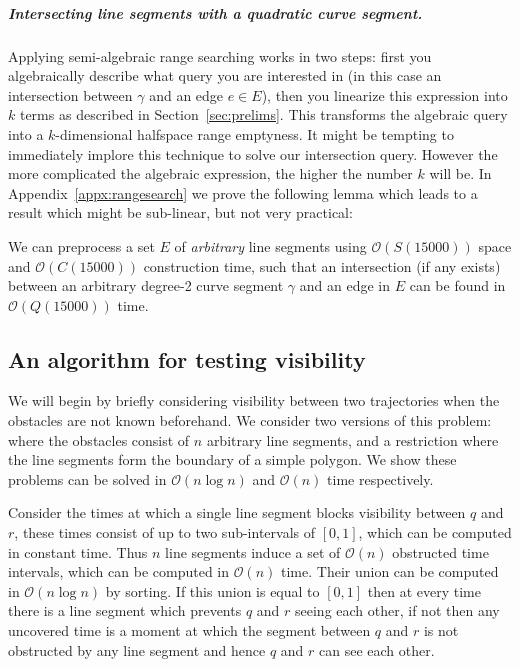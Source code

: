 \documentclass[UKenglish]{lipics-v2019}
\begin{document}
\subparagraph{Intersecting line segments with a quadratic curve segment.}
Applying semi-algebraic range searching works in two steps: first you algebraically describe what query you are interested in (in this case an intersection between $\gamma$ and an edge $e \in E$), then you linearize this expression into $k$ terms as described in Section~\ref{sec:prelims}. This transforms the algebraic query into a $k$-dimensional halfspace range emptyness. It might be tempting to immediately implore this technique to solve our intersection query. However the more complicated the algebraic expression, the higher the number $k$ will be. In Appendix~\ref{appx:rangesearch} we prove the following lemma which leads to a result which might be sub-linear, but not very practical:

\begin{lemma}
\label{lemma:15000}
We can preprocess a set $E$ of \emph{arbitrary} line segments using $\mathcal{O}(S(15000))$ space and $\mathcal{O}(C(15000))$ construction time, such that an intersection (if any exists) between an arbitrary degree-2 curve segment $\gamma$ and an edge in $E$ can be found in $\mathcal{O}(Q(15000))$ time.
\end{lemma}


\subsection{An algorithm for testing visibility}
\label{subsec:oneshots}

We will begin by briefly considering visibility between two trajectories when the obstacles are not known beforehand. We consider two versions of this problem: where the obstacles consist of $n$ arbitrary line segments, and a restriction where the line segments form the boundary of a simple polygon. We show these problems can be solved in $\mathcal{O}(n \log n)$ and $\mathcal{O}(n)$ time respectively.

Consider the times at which a single line segment blocks visibility between $q$ and $r$, these times consist of up to two sub-intervals of $[0, 1]$, which can be computed in constant time. Thus $n$ line segments induce a set of $\mathcal{O}(n)$ obstructed time intervals, which can be computed in $\mathcal{O}(n)$ time. Their union can be computed in $\mathcal{O}(n \log n)$ by sorting. If this union is equal to $[0, 1]$ then at every time there is a line segment which prevents $q$ and $r$ seeing each other, if not then any uncovered time is a moment at which the segment between $q$ and $r$ is not obstructed by any line segment and hence $q$ and $r$ can see each other.
\end{document}
